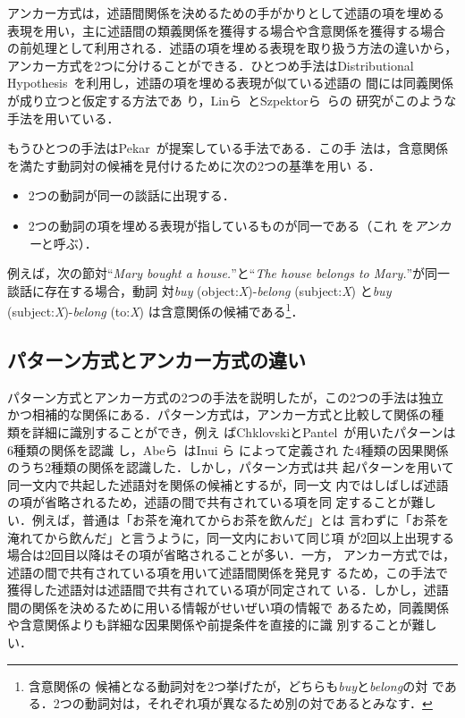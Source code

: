 \documentclass[japanese]{jnlp_1.4}
\begin{document}
アンカー方式は，述語間関係を決めるための手がかりとして述語の項を埋める
表現を用い，主に述語間の類義関係を獲得する場合や含意関係を獲得する場合
の前処理として利用される．述語の項を埋める表現を取り扱う方法の違いから，
アンカー方式を2つに分けることができる．ひとつめ手法はDistributional
Hypothesis~\cite{harris}を利用し，述語の項を埋める表現が似ている述語の
間には同義関係が成り立つと仮定する方法であ
り，Linら~\cite{lin:01}とSzpektorら~\cite{szpektor-EtAl:2004:EMNLP}らの
研究がこのような手法を用いている．

もうひとつの手法はPekar~\cite{pekar:06}が提案している手法である．この手
法は，含意関係を満たす動詞対の候補を見付けるために次の2つの基準を用い
る．
\begin{itemize}
\item 2つの動詞が同一の談話に出現する．
\item 2つの動詞の項を埋める表現が指しているものが同一である（これ
  を\emph{アンカー}と呼ぶ）．
\end{itemize}
例えば，次の節対``\emph{Mary bought a house.}''と``\emph{The house
  belongs to Mary.}''が同一談話に存在する場合，動詞
対\emph{buy} (object:\emph{X})-\emph{belong} (subject:\emph{X}) と\emph{buy} (subject:\emph{X})-\emph{belong} (to:\emph{X}) は含意関係の候補である\footnote{含意関係の
  候補となる動詞対を2つ挙げたが，どちらも\emph{buy}と\emph{belong}の対
  である．2つの動詞対は，それぞれ項が異なるため別の対であるとみなす．}．



\subsection{パターン方式とアンカー方式の違い}

パターン方式とアンカー方式の2つの手法を説明したが，この2つの手法は独立
かつ相補的な関係にある．パターン方式は，アンカー方式と比較して関係の種
類を詳細に識別することができ，例え
ばChklovskiとPantel~\cite{chklovski}が用いたパターンは6種類の関係を認識
し，Abeら~\cite{abe:08}はInui ら \cite{inui:DS03}によって定義され
た4種類の因果関係のうち2種類の関係を認識した．しかし，パターン方式は共
起パターンを用いて同一文内で共起した述語対を関係の候補とするが，同一文
内ではしばしば述語の項が省略されるため，述語の間で共有されている項を同
定することが難しい．例えば，普通は「お茶を淹れてからお茶を飲んだ」とは
言わずに「お茶を淹れてから飲んだ」と言うように，同一文内において同じ項
が2回以上出現する場合は2回目以降はその項が省略されることが多い．一方，
アンカー方式では，述語の間で共有されている項を用いて述語間関係を発見す
るため，この手法で獲得した述語対は述語間で共有されている項が同定されて
いる．しかし，述語間の関係を決めるために用いる情報がせいぜい項の情報で
あるため，同義関係や含意関係よりも詳細な因果関係や前提条件を直接的に識
別することが難しい．
\end{document}
